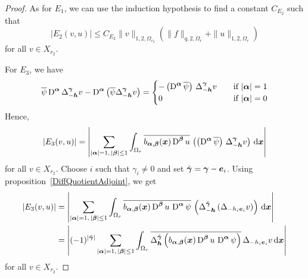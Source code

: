 \begin{proof}
As for $E_1$, we can use the induction
hypothesis to find a constant $C_{E_2}$ such that
\[
\left| E_2(v,u) \right| \leq C_{E_2} \|v\|_{1,2,\Omega_{r_2}}
\left( \|f\|_{q,2,\Omega_r} + \|u\|_{1,2,\Omega_r} \right)
\]
for all $v \in X_{r_2}$.

For $E_3$, we have
\[
\overline{\psi} \diff^{\VEC{\alpha}} \Delta_{-\VEC{h}}^{\VEC{\gamma}} v -
\diff^{\VEC{\alpha}} \left( \overline{\psi}
\Delta_{-\VEC{h}}^{\VEC{\gamma}} v \right)
= \begin{cases}
- \left( \diff^{\VEC{\alpha}} \overline{\psi} \right) \,
\Delta_{-\VEC{h}}^{\VEC{\gamma}} v & \quad \text{if} \ |\VEC{\alpha}|=1 \\
0 & \quad \text{if} \ |\VEC{\alpha}| = 0
\end{cases}
\]
Hence,
\[
\left| E_3(v,u) \right| = \left| \sum_{|{\bm{\alpha}}|=1,\,|{\bm{\beta}}|\leq 1}
\int_{\Omega_r} \overline{b_{{\bm{\alpha}},{\bm{\beta}}}({\bm{x}})
\operatorname{D}^{{\bm{\beta}}} u} \,
\left( \left( \operatorname{D}^{{\bm{\alpha}}} \overline{\psi} \right) \,
\Delta_{-{\bm{h}}}^{{\bm{\gamma}}} v \right) \,\mathrm{d}{{\bm{x}}} \right|
\]
for all $v \in X_{r_2}$.  Choose $i$ such that $\gamma_i \neq 0$ and set
$\tilde{{\bm{\gamma}}} = {\bm{\gamma}} - {\bm{e}}_i$.  Using
proposition~\ref{DiffQuotientAdjoint}, we get
\begin{align*}
\left| E_3(v,u) \right|
&= \left| \sum_{|{\bm{\alpha}}|=1,\,|{\bm{\beta}}|\leq 1}
\int_{\Omega_r} \overline{b_{{\bm{\alpha}},{\bm{\beta}}}({\bm{x}})
\operatorname{D}^{{\bm{\beta}}} u \,
\operatorname{D}^{{\bm{\alpha}}} \psi} \, \left(\Delta^{\tilde{{\bm{\gamma}}}}_{-{\bm{h}}}
\left(\Delta_{-h_i {\bm{e}}_i} v \right) \right) \,\mathrm{d}{{\bm{x}}} \right| \\
&= \left| (-1)^{|\tilde{{\bm{\gamma}}}|}
\sum_{|{\bm{\alpha}}|= 1,\,|{\bm{\beta}}|\leq 1}
\int_{\Omega_r} \overline{ \Delta_{{\bm{h}}}^{\tilde{{\bm{\gamma}}}} \left(
b_{{\bm{\alpha}},{\bm{\beta}}}({\bm{x}}) \operatorname{D}^{{\bm{\beta}}} u \,
\operatorname{D}^{{\bm{\alpha}}} \psi \right)} \,
\Delta_{-h_i{\bm{e}}_i} v \,\mathrm{d}{{\bm{x}}} \right|
\end{align*}
for all $v \in X_{r_2}$.


\end{proof}
